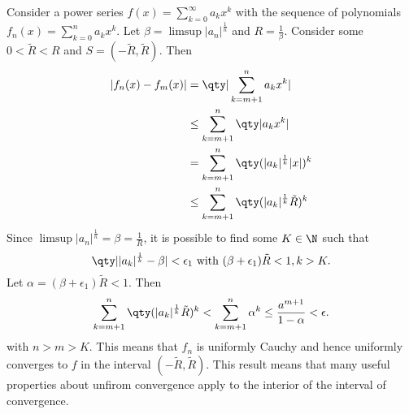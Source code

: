 \documentclass[../notes.tex]{subfiles}
\begin{document}
\begin{example}
    Consider a power series $f(x) = \displaystyle\sum_{k=0}^\infty a_k x^k$ with the sequence of polynomials $f_n(x) = \displaystyle\sum_{k=0}^n a_k x^k$. Let $\beta = \limsup |a_n|^{\frac{1}{n}}$ and $R = \frac{1}{\beta}$. Consider some $0 < \tilde{R} < R$ and $S = (-\tilde{R}, \tilde{R})$. Then
    \begin{align*}
        |f_n(x) - f_m(x)| &= \qty|\sum_{k=m+1}^n a_k x^k| \\
                      &\leq \sum_{k=m+1}^n \qty|a_k x^k| \\
                      &= \sum_{k=m+1}^n \qty(|a_k|^{\frac{1}{k}} |x|)^k \\
                      &\leq \sum_{k=m+1}^n \qty(|a_k|^{\frac{1}{k}} \tilde{R})^k \\
    \end{align*}
    Since $\limsup |a_n|^{\frac{1}{n}} = \beta = \frac{1}{R}$, it is possible to find some $K \in \N$ such that
    \[
        \qty||a_k|^{\frac{1}{k}} - \beta| < \epsilon_1 \text{ with } (\beta + \epsilon_1) \tilde{R} < 1, k > K
    .\]
    Let $\alpha = (\beta + \epsilon_1) \tilde{R} < 1$. Then
    \[
        \sum_{k=m+1}^n \qty(|a_k|^{\frac{1}{k}} \tilde{R})^k < \sum_{k=m+1}^n \alpha^k \leq \frac{a^{m+1}}{1 - \alpha} < \epsilon
    .\]
    with $n > m > K$. This means that $f_n$ is uniformly Cauchy and hence uniformly converges to $f$ in the interval $(-\tilde{R}, \tilde{R})$. This result means that many useful properties about unfirom convergence apply to the interior of the interval of convergence.
\end{example}
\end{document}
